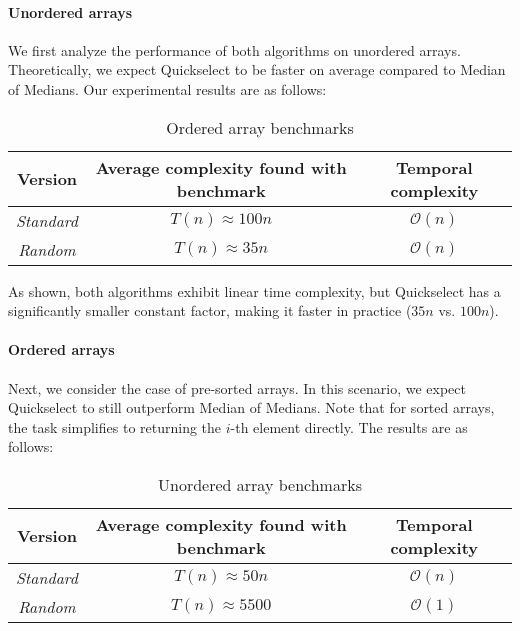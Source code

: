 \documentclass[paper=a4, fontsize=11pt]{scrartcl}
\numberwithin{equation}{section}
\numberwithin{figure}{section}
\numberwithin{table}{section}
\begin{document}
    \paragraph{Unordered arrays}
    We first analyze the performance of both algorithms on unordered arrays.
    Theoretically, we expect Quickselect to be faster on average compared to Median of Medians.
    Our experimental results are as follows:
    \begin{table}[h!]
        \centering
        \begin{tabular}{|c|c|c|}
        \hline
        \textbf{Version}  & \textbf{Average complexity found with benchmark} & \textbf{Temporal complexity}      \\ \hline
        \textit{Standard} & $T(n) \approx 100n$                                   & $\mathcal{O}(n)$             \\
        \textit{Random}   & $T(n) \approx 35n$                                    & $\mathcal{O}(n)$             \\ \hline
        \end{tabular}
        \caption{Ordered array benchmarks}
    \end{table}
    
    As shown, both algorithms exhibit linear time complexity, but Quickselect has a significantly smaller constant factor, making it faster in practice ($35n$ vs. $100n$).

    \paragraph{Ordered arrays}
    Next, we consider the case of pre-sorted arrays.
    In this scenario, we expect Quickselect to still outperform Median of Medians.
    Note that for sorted arrays, the task simplifies to returning the $i$-th element directly.
    The results are as follows:
    \begin{table}[h!]
        \centering
        \begin{tabular}{|c|c|c|}
        \hline
        \textbf{Version}  & \textbf{Average complexity found with benchmark} & \textbf{Temporal complexity}      \\ \hline
        \textit{Standard} & $T(n) \approx 50n$                                   & $\mathcal{O}(n)$             \\
        \textit{Random}   & $T(n) \approx 5500$                                  & $\mathcal{O}(1)$             \\ \hline
        \end{tabular}
        \caption{Unordered array benchmarks}
    \end{table}
    
\end{document}
